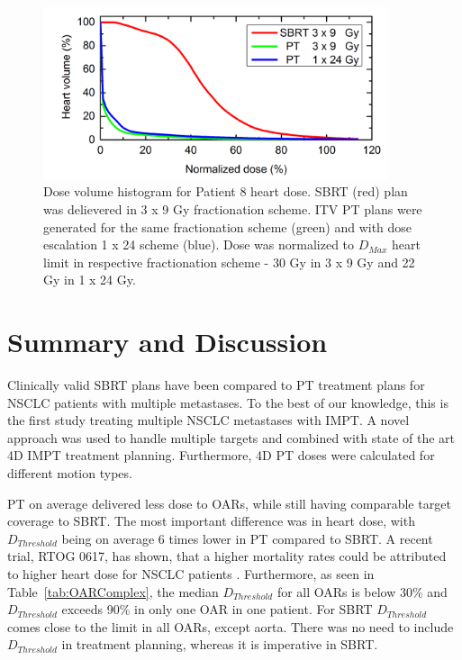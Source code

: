 \begin{figure}[H]
	\begin{center}
		\includegraphics[width=0.9\textwidth]{./ComplexPatients/Images/HeartDVH.png}
		\caption{Dose volume histogram for Patient 8 heart dose. SBRT (red) plan was delievered in 3 x 9 Gy fractionation scheme. ITV
		 PT plans were generated for the same fractionation scheme (green) and with dose escalation 1 x 24 scheme (blue). Dose was normalized 
		 to $D_{Max}$ heart limit in respective fractionation scheme - 30 Gy in 3 x 9 Gy and 22 Gy in 1 x 24 Gy.}
		\label{Fig:heartDVH}
	\end{center}
\end{figure}
\newpage

\section{Summary and Discussion}

Clinically valid SBRT plans have been compared to PT treatment plans for NSCLC patients with multiple metastases. 
To the best of our knowledge, this is the first study treating multiple NSCLC metastases with IMPT. A novel approach was used to handle multiple targets and combined
with state of the art 4D IMPT treatment planning. Furthermore, 4D PT doses were calculated for different motion types. 

PT on average delivered less dose to OARs, while still having comparable target coverage to SBRT.
The most important difference was in heart dose, with $D_{Threshold}$ being on average 6 times lower in PT compared to SBRT. A recent trial, RTOG 0617, has shown,
that a higher mortality rates could be attributed to higher heart dose for NSCLC patients \cite{Bradley2015}. Furthermore, as seen in Table~\ref{tab:OARComplex}, the median
$D_{Threshold}$ for all OARs is below 30\% and $D_{Threshold}$ exceeds 90\% in only one OAR in one patient. For SBRT $D_{Threshold}$ comes close to the limit in all OARs,
except aorta. There was no need to include $D_{Threshold}$ in treatment planning, whereas it is imperative in SBRT.

